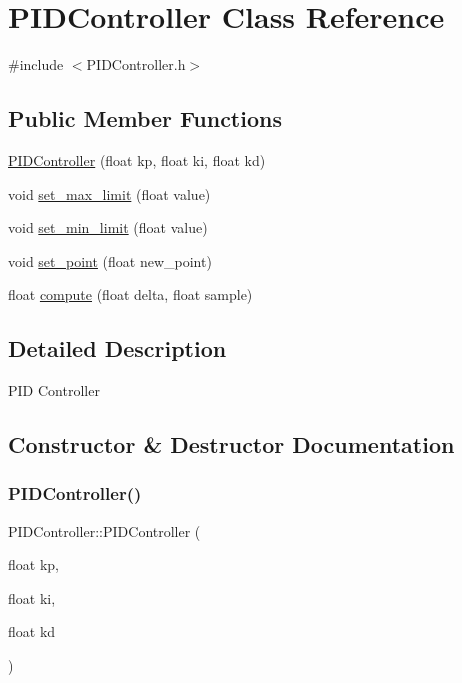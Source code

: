 \hypertarget{classPIDController}{}\section{P\+I\+D\+Controller Class Reference}
\label{classPIDController}


{\ttfamily \#include $<$P\+I\+D\+Controller.\+h$>$}

\subsection*{Public Member Functions}
\begin{DoxyCompactItemize}
\item 
\mbox{\hyperlink{classPIDController_af50f86800ed8b6c79ff3fc10c6f6f645}{P\+I\+D\+Controller}} (float kp, float ki, float kd)
\item 
void \mbox{\hyperlink{classPIDController_aa6bc9afda2652915eaee75376ac35ec9}{set\+\_\+max\+\_\+limit}} (float value)
\item 
void \mbox{\hyperlink{classPIDController_a0e3ca1d0d38d9348cda94e8deb9b6497}{set\+\_\+min\+\_\+limit}} (float value)
\item 
void \mbox{\hyperlink{classPIDController_a71c93fafc54a8235f259f9d935fdaf79}{set\+\_\+point}} (float new\+\_\+point)
\item 
float \mbox{\hyperlink{classPIDController_afd70ecf3f6f5f10181860eb067da1b43}{compute}} (float delta, float sample)
\end{DoxyCompactItemize}


\subsection{Detailed Description}
P\+ID Controller 

\subsection{Constructor \& Destructor Documentation}
\mbox{\label{classPIDController_af50f86800ed8b6c79ff3fc10c6f6f645}} 
\subsubsection{\texorpdfstring{P\+I\+D\+Controller()}{PIDController()}}
{\footnotesize\ttfamily P\+I\+D\+Controller\+::\+P\+I\+D\+Controller (\begin{DoxyParamCaption}\item[{float}]{kp,  }\item[{float}]{ki,  }\item[{float}]{kd }\end{DoxyParamCaption})}

